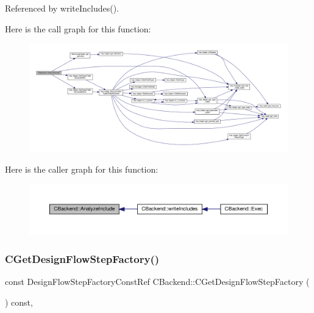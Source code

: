 Referenced by write\+Includes().

Here is the call graph for this function\+:
\nopagebreak
\begin{figure}[H]
\begin{center}
\leavevmode
\includegraphics[width=350pt]{d3/de2/classCBackend_a6f6d94270928c1a0b1100d79272daa2f_cgraph}
\end{center}
\end{figure}
Here is the caller graph for this function\+:
\nopagebreak
\begin{figure}[H]
\begin{center}
\leavevmode
\includegraphics[width=350pt]{d3/de2/classCBackend_a6f6d94270928c1a0b1100d79272daa2f_icgraph}
\end{center}
\end{figure}
\mbox{\label{classCBackend_ae88e75e47f68079871cad2be17fde136}} 
\subsubsection{\texorpdfstring{C\+Get\+Design\+Flow\+Step\+Factory()}{CGetDesignFlowStepFactory()}}
{\footnotesize\ttfamily const Design\+Flow\+Step\+Factory\+Const\+Ref C\+Backend\+::\+C\+Get\+Design\+Flow\+Step\+Factory (\begin{DoxyParamCaption}{ }\end{DoxyParamCaption}) const\hspace{0.3cm}{\ttfamily [override]}, {\ttfamily [virtual]}}



